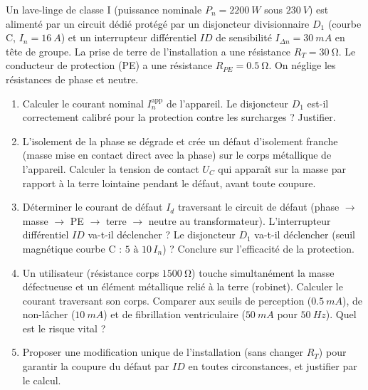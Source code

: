 \documentclass[11pt]{article}
\begin{document}
\begin{exercice}
Un lave-linge de classe I (puissance nominale $P_n=\SI{2200}{W}$ sous $\SI{230}{V}$) est alimenté par un circuit dédié protégé par un disjoncteur divisionnaire $D_1$ (courbe C, $I_n=\SI{16}{A}$) et un interrupteur différentiel $ID$ de sensibilité $I_{\Delta n}=\SI{30}{mA}$ en tête de groupe. La prise de terre de l'installation a une résistance $R_T=\SI{30}{\ohm}$. Le conducteur de protection (PE) a une résistance $R_{PE}=\SI{0,5}{\ohm}$. On néglige les résistances de phase et neutre.
\begin{enumerate}
    \item Calculer le courant nominal $I_n^{\text{app}}$ de l'appareil. Le disjoncteur $D_1$ est-il correctement calibré pour la protection contre les surcharges ? Justifier.
    \item L'isolement de la phase se dégrade et crée un défaut d'isolement franche (masse mise en contact direct avec la phase) sur le corps métallique de l'appareil. Calculer la tension de contact $U_C$ qui apparaît sur la masse par rapport à la terre lointaine pendant le défaut, avant toute coupure. 
    \item Déterminer le courant de défaut $I_d$ traversant le circuit de défaut (phase $\to$ masse $\to$ PE $\to$ terre $\to$ neutre au transformateur). L'interrupteur différentiel $ID$ va-t-il déclencher ? Le disjoncteur $D_1$ va-t-il déclencher (seuil magnétique courbe C : $5\text{ à }10\,I_n$) ? Conclure sur l'efficacité de la protection.
    \item Un utilisateur (résistance corps $\SI{1500}{\ohm}$) touche simultanément la masse défectueuse et un élément métallique relié à la terre (robinet). Calculer le courant traversant son corps. Comparer aux seuils de perception ($\SI{0,5}{mA}$), de non-lâcher ($\SI{10}{mA}$) et de fibrillation ventriculaire ($\SI{50}{mA}$ pour $\SI{50}{Hz}$). Quel est le risque vital ?
    \item Proposer une modification unique de l'installation (sans changer $R_T$) pour garantir la coupure du défaut par $ID$ en toutes circonstances, et justifier par le calcul.
\end{enumerate}
\end{exercice}
\end{document}

